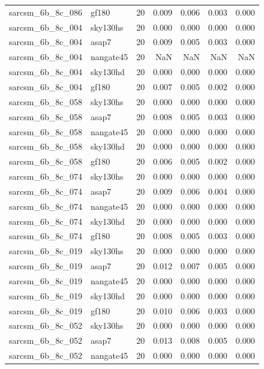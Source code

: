 \begin{tabular}{llrrrrr}
sarcsm\_6b\_8c\_086 & gf180 & 20 & 0.009 & 0.006 & 0.003 & 0.000 \\
sarcsm\_6b\_8c\_004 & sky130hs & 20 & 0.000 & 0.000 & 0.000 & 0.000 \\
sarcsm\_6b\_8c\_004 & asap7 & 20 & 0.009 & 0.005 & 0.003 & 0.000 \\
sarcsm\_6b\_8c\_004 & nangate45 & 20 & NaN & NaN & NaN & NaN \\
sarcsm\_6b\_8c\_004 & sky130hd & 20 & 0.000 & 0.000 & 0.000 & 0.000 \\
sarcsm\_6b\_8c\_004 & gf180 & 20 & 0.007 & 0.005 & 0.002 & 0.000 \\
sarcsm\_6b\_8c\_058 & sky130hs & 20 & 0.000 & 0.000 & 0.000 & 0.000 \\
sarcsm\_6b\_8c\_058 & asap7 & 20 & 0.008 & 0.005 & 0.003 & 0.000 \\
sarcsm\_6b\_8c\_058 & nangate45 & 20 & 0.000 & 0.000 & 0.000 & 0.000 \\
sarcsm\_6b\_8c\_058 & sky130hd & 20 & 0.000 & 0.000 & 0.000 & 0.000 \\
sarcsm\_6b\_8c\_058 & gf180 & 20 & 0.006 & 0.005 & 0.002 & 0.000 \\
sarcsm\_6b\_8c\_074 & sky130hs & 20 & 0.000 & 0.000 & 0.000 & 0.000 \\
sarcsm\_6b\_8c\_074 & asap7 & 20 & 0.009 & 0.006 & 0.004 & 0.000 \\
sarcsm\_6b\_8c\_074 & nangate45 & 20 & 0.000 & 0.000 & 0.000 & 0.000 \\
sarcsm\_6b\_8c\_074 & sky130hd & 20 & 0.000 & 0.000 & 0.000 & 0.000 \\
sarcsm\_6b\_8c\_074 & gf180 & 20 & 0.008 & 0.005 & 0.003 & 0.000 \\
sarcsm\_6b\_8c\_019 & sky130hs & 20 & 0.000 & 0.000 & 0.000 & 0.000 \\
sarcsm\_6b\_8c\_019 & asap7 & 20 & 0.012 & 0.007 & 0.005 & 0.000 \\
sarcsm\_6b\_8c\_019 & nangate45 & 20 & 0.000 & 0.000 & 0.000 & 0.000 \\
sarcsm\_6b\_8c\_019 & sky130hd & 20 & 0.000 & 0.000 & 0.000 & 0.000 \\
sarcsm\_6b\_8c\_019 & gf180 & 20 & 0.010 & 0.006 & 0.003 & 0.000 \\
sarcsm\_6b\_8c\_052 & sky130hs & 20 & 0.000 & 0.000 & 0.000 & 0.000 \\
sarcsm\_6b\_8c\_052 & asap7 & 20 & 0.013 & 0.008 & 0.005 & 0.000 \\
sarcsm\_6b\_8c\_052 & nangate45 & 20 & 0.000 & 0.000 & 0.000 & 0.000 \\

\end{tabular}
